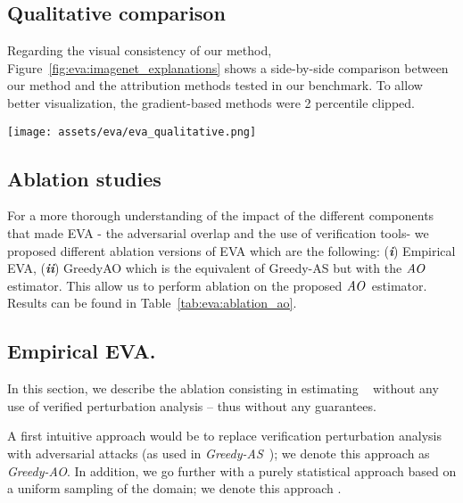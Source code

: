 \subsection{Qualitative comparison}

Regarding the visual consistency of our method, Figure~\ref{fig:eva:imagenet_explanations} shows a side-by-side comparison between our method and the attribution methods  tested in our benchmark. 
To allow better visualization, the gradient-based
methods were 2 percentile clipped.

\begin{figure*}[!ht]
  \centering
  \texttt{[image: assets/eva/eva\_qualitative.png]}
  \caption{\textbf{Qualitative comparison} with other attribution methods. To allow for better visualization, the gradient-based methods (Saliency, Gradient-Input, SmoothGrad, Integrated-Gradient, VarGrad) are clipped at the 2nd percentile. For more results and details on each method and choice of hyperparameters, see Appendix.
  }
  \vspace{-2mm}
  \label{fig:eva:imagenet_explanations}
\end{figure*}

\subsection{Ablation studies}
\label{ap:eva:benchmarks}



For a more thorough understanding of the impact of the different components that made EVA - the adversarial overlap and the use of verification tools- we proposed different ablation versions of EVA which are the following:
(\textbf{\textit{i}}) Empirical EVA, (\textbf{\textit{ii}}) GreedyAO which is the equivalent of Greedy-AS but with the $\textit{AO}$ estimator. This allow us to perform ablation on the proposed $\textit{AO}$~estimator. Results can be found in Table~\ref{tab:eva:ablation_ao}.
\subsection{Empirical EVA.}
    
In this section, we describe the ablation consisting in estimating \eva~ without any use of verified perturbation analysis -- thus without any guarantees.

A first intuitive approach would be to replace verification perturbation analysis with adversarial attacks (as used in \textit{Greedy-AS}~\cite{hsieh2020evaluations}); we denote this approach as \textit{Greedy-AO}. 
In addition, we go further with a purely statistical approach based on a uniform sampling of the domain; we denote this approach \evaEmp. 
    
